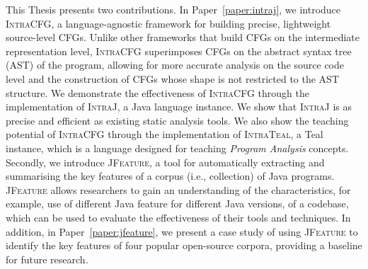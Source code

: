 This Thesis presents two contributions.
In Paper~\ref{paper:intraj},  we introduce \textsc{IntraCFG}, a language-agnostic framework for building
precise, lightweight source-level CFGs. Unlike other frameworks that 
build CFGs on the intermediate representation level, \textsc{IntraCFG} superimposes 
CFGs on the abstract syntax tree (AST) of the program, allowing for more accurate 
analysis on the source code level and the construction of CFGs whose shape is not 
restricted to the AST structure. We demonstrate the effectiveness
of \textsc{IntraCFG} through the implementation of \textsc{IntraJ}, a Java language
instance. We show that \textsc{IntraJ} is as precise and efficient as existing 
static analysis tools. We also show the teaching potential of \textsc{IntraCFG} 
through the implementation of \textsc{IntraTeal}, a Teal instance, which
is a language designed for teaching \emph{Program Analysis} concepts.
Secondly, we introduce \textsc{JFeature}, a tool for automatically extracting and summarising
the key features of a corpus (i.e., collection) of Java programs. \textsc{JFeature}
allows researchers to gain an understanding of the characteristics, for example,
use of different Java feature for different Java versions, of a codebase,
which can be used to evaluate the effectiveness of their tools and techniques.
In addition, in Paper~\ref{paper:jfeature}, we present a case study of using \textsc{JFeature} to
identify the key features of four popular open-source corpora, providing a
baseline for future research.







